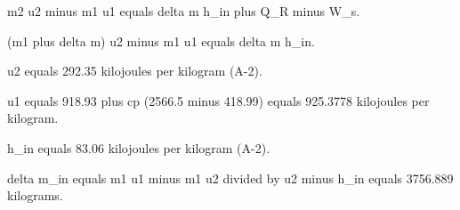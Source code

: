 m2 u2 minus m1 u1 equals delta m h_in plus Q_R minus W_s.  

(m1 plus delta m) u2 minus m1 u1 equals delta m h_in.  

u2 equals 292.35 kilojoules per kilogram (A-2).  

u1 equals 918.93 plus cp (2566.5 minus 418.99) equals 925.3778 kilojoules per kilogram.  

h_in equals 83.06 kilojoules per kilogram (A-2).  

delta m_in equals m1 u1 minus m1 u2 divided by u2 minus h_in equals 3756.889 kilograms.